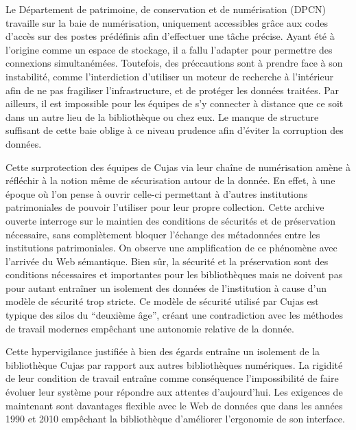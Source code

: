 Le Département de patrimoine, de conservation et de numérisation (DPCN) travaille sur la baie de numérisation, uniquement accessibles grâce aux codes d'accès sur des postes prédéfinis afin d'effectuer une tâche précise. Ayant été à l'origine comme un espace de stockage, il a fallu l'adapter pour permettre des connexions simultanémées. Toutefois, des préccautions sont à prendre face à son instabilité, comme l'interdiction d'utiliser un moteur de recherche à l'intérieur afin de ne pas fragiliser l'infrastructure, et de protéger les données traitées. Par ailleurs, il est impossible pour les équipes de s'y connecter à distance que ce soit dans un autre lieu de la bibliothèque ou chez eux. Le manque de structure suffisant de cette baie oblige à ce niveau prudence afin d'éviter la corruption des données.
 
Cette surprotection des équipes de Cujas via leur chaîne de numérisation amène à réfléchir à la notion même de sécurisation autour de la donnée. En effet, à une époque où l'on pense à ouvrir celle-ci permettant à d'autres institutions patrimoniales de pouvoir l'utiliser pour leur propre collection. Cette archive ouverte interroge sur le maintien des conditions de sécurités et de préservation nécessaire, sans complètement bloquer l'échange des métadonnées entre les institutions patrimoniales. On observe une amplification de ce phénomène avec l'arrivée du Web sémantique. Bien sûr, la sécurité et la préservation sont des conditions nécessaires et importantes pour les bibliothèques mais ne doivent pas pour autant entraîner un isolement des données de l'institution à cause d'un modèle de sécurité trop stricte. Ce modèle de sécurité utilisé par Cujas est typique des silos du \enquote{deuxième âge}, créant une contradiction avec les méthodes de travail modernes empêchant une autonomie relative de la donnée. 

Cette hypervigilance justifiée à bien des égards entraîne un isolement de la bibliothèque Cujas par rapport aux autres bibliothèques numériques. La rigidité de leur condition de travail entraîne comme conséquence l'impossibilité de faire évoluer leur système pour répondre aux attentes d'aujourd'hui. Les exigences de maintenant sont davantages flexible avec le Web de données que dans les années 1990 et 2010 empêchant la bibliothèque d'améliorer l'ergonomie de son interface.